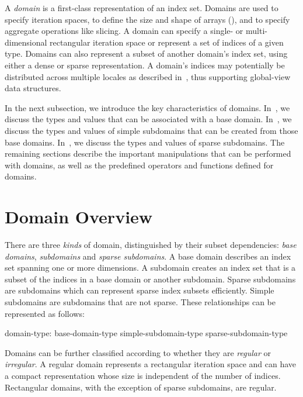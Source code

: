 \label{Domains}

A \emph{domain} is a first-class representation of an index set.
Domains are used to specify iteration spaces, to define the size and
shape of arrays (), and to specify aggregate operations
like slicing.
A domain can specify a single- or multi-dimensional
rectangular iteration space or represent a set of indices of
a given type.  Domains can also represent a subset of another domain's index set,
using either a dense or sparse representation.
A domain's
indices may potentially be distributed across multiple locales as
described in~, thus supporting global-view data
structures.

In the next subsection, we introduce the key characteristics of domains.
In~, we discuss the types and values that
can be associated with a base domain.  In~, we discuss the
types and values of simple subdomains that can be created from those base
domains.  In~, we discuss the types and values of sparse
subdomains.  The remaining sections describe the important manipulations
that can be performed with domains, as well as the predefined operators and
functions defined for domains.

\section{Domain Overview}

There are three \emph{kinds} of domain, distinguished by their subset
dependencies: \emph{base domains}, \emph{subdomains} and \emph{sparse
subdomains}.  A base domain describes an index set spanning one or more
dimensions.  A subdomain creates an index set that is a subset of the indices in
a base domain or another subdomain.  Sparse subdomains are subdomains which can
represent sparse index subsets efficiently.  Simple subdomains are subdomains
that are not sparse.  These relationships can be represented as follows:

\begin{syntax}
domain-type:
  base-domain-type
  simple-subdomain-type
  sparse-subdomain-type
\end{syntax}

Domains can be further classified according to whether they are \emph{regular}
or \emph{irregular}.  A regular domain represents a rectangular iteration
space and can have a compact representation whose size is independent
of the number of indices. Rectangular domains, with the exception of
sparse subdomains, are regular.

